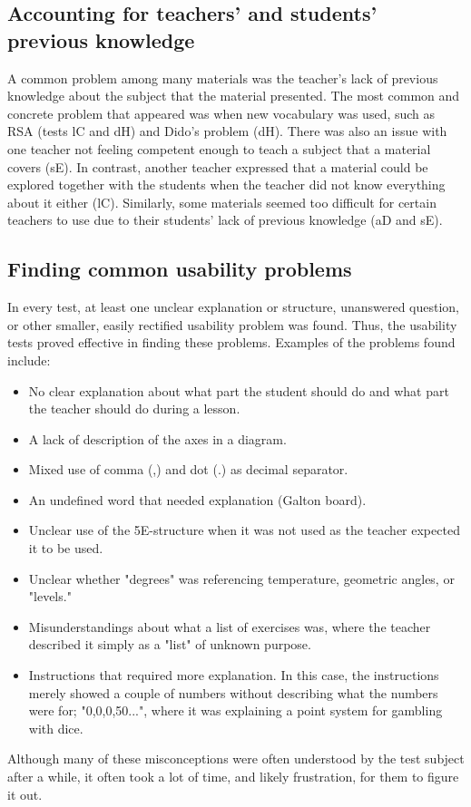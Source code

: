 \subsection{Accounting for teachers' and students' previous knowledge} \label{prevknowledge}
A common problem among many materials was the teacher's lack of previous knowledge about the subject that the material presented. The most common and concrete problem that appeared was when new vocabulary was used, such as RSA (tests lC and dH) and Dido's problem (dH). There was also an issue with one teacher not feeling competent enough to teach a subject that a material covers (sE). In contrast, another teacher expressed that a material could be explored together with the students when the teacher did not know everything about it either (lC). Similarly, some materials seemed too difficult for certain teachers to use due to their students' lack of previous knowledge (aD and sE).

\subsection{Finding common usability problems}
In every test, at least one unclear explanation or structure, unanswered question, or other smaller, easily rectified usability problem was found. Thus, the usability tests proved effective in finding these problems. Examples of the problems found include:
\begin{itemize}
	\item No clear explanation about what part the student should do and what part the teacher should do during a lesson.
	\item A lack of description of the axes in a diagram.
	\item Mixed use of comma (,) and dot (.) as decimal separator.
	\item An undefined word that needed explanation (Galton board).
	\item Unclear use of the 5E-structure when it was not used as the teacher expected it to be used.
	\item Unclear whether "degrees" was referencing temperature, geometric angles, or "levels."
	\item Misunderstandings about what a list of exercises was, where the teacher described it simply as a "list" of unknown purpose.
	\item Instructions that required more explanation. In this case, the instructions merely showed a couple of numbers without describing what the numbers were for; "0,0,0,50...", where it was explaining a point system for gambling with dice.
\end{itemize}

Although many of these misconceptions were often understood by the test subject after a while, it often took a lot of time, and likely frustration, for them to figure it out.
